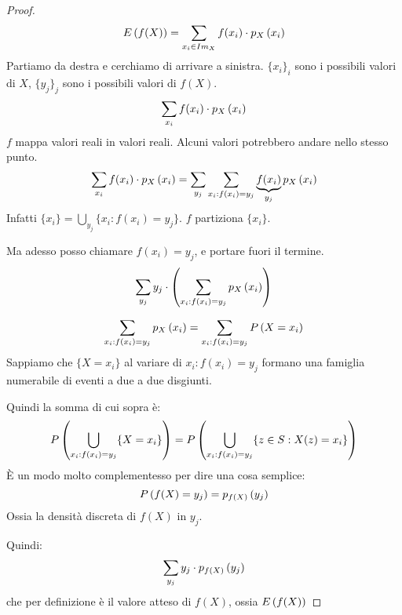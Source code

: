 \begin{proof}
\[
\expect{f(X)} = \sum_{x_i \in \image{X}} f(x_i) \cdot \mass{x_i}
\]
Partiamo da destra e cerchiamo di arrivare a sinistra. $\{ x_i \}_i$ sono i possibili valori di $X$, $\{ y_j \}_j$ sono i possibili valori di $f(X)$.
\[
\sum_{x_i} f(x_i) \cdot \mass{x_i}
\]
$f$ mappa valori reali in valori reali. Alcuni valori potrebbero andare nello stesso punto.
\[
\sum_{x_i} f(x_i) \cdot \mass{x_i} =
\sum_{y_j} \sum_{x_i : f(x_i) = y_j} \underbrace{f(x_i)}_{y_j} \mass{x_i}
\]
Infatti $\{x_i\} = \bigcup_{y_j} \{x_i : f(x_i) = y_j \}$. $f$ partiziona $\{ x_i \}$.

Ma adesso posso chiamare $f(x_i) = y_j$, e portare fuori il termine.
\[
\sum_{y_j} y_j \cdot \left( \sum_{x_i : f(x_i) = y_j} \mass{x_i} \right)
\]
\begin{oss}
\[
\sum_{x_i : f(x_i) = y_j} \mass{x_i} = \sum_{x_i : f(x_i) = y_j} \prob{X = x_i}
\]
Sappiamo che $\{X = x_i\}$ al variare di $x_i : f(x_i) = y_j$ formano una famiglia numerabile di eventi a due a due disgiunti.

Quindi la somma di cui sopra \`e:
\[
\prob{\bigcup_{x_i : f(x_i) = y_j} \{X = x_i\}} =
\prob{\bigcup_{x_i : f(x_i) = y_j} \{z \in S : X(z) = x_i\}}
\]
\`E un modo molto complementesso per dire una cosa semplice:
\[
\prob{f(X) = y_j} = \mass[f(X)]{y_j}
\]
Ossia la densit\`a discreta di $f(X)$ in $y_j$.
\end{oss}
Quindi:
\[
\sum_{y_j} y_j \cdot \mass[f(X)]{y_j}
\]
che per definizione \`e il valore atteso di $f(X)$, ossia $\expect{f(X)}$
\end{proof}

